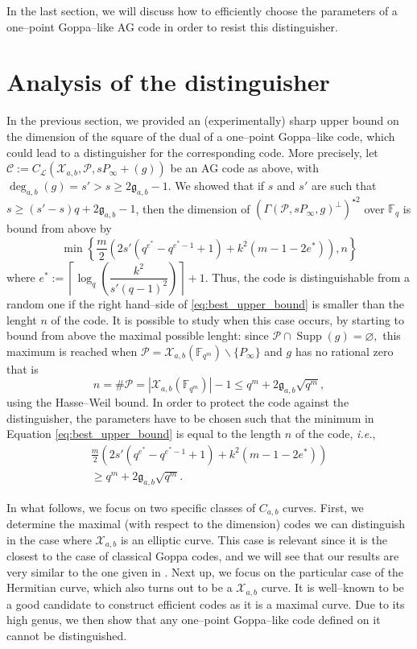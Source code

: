 \documentclass[lettersize,journal]{IEEEtran}
\theoremstyle{plain}
\theoremstyle{definition}
\theoremstyle{remark}
\newcommand{\calP}{\mathcal{P}}
\newcommand{\calL}{\mathcal{L}}
\newcommand{\calC}{\mathcal{C}}
\newcommand{\calX}{\mathcal{X}}
\newcommand{\fqm}{\mathbb{F}_{q^m}}
\newcommand{\fq}{\mathbb{F}_{q}}
\newcommand{\Supp}{\operatorname{Supp}}
\newcommand{\degab}[1]{\deg_{a,b}\left(#1\right)}
\begin{document}
	In the last section, we will discuss how to efficiently choose the parameters of a one--point Goppa--like AG code in order to resist this distinguisher.
	
	\section{Analysis of the distinguisher}\label{sec:analysis}
	
	In the previous section, we provided an (experimentally) sharp upper bound on the dimension of the square of the dual of a one--point Goppa--like code, which could lead to a distinguisher for the corresponding code. More precisely, let $\calC := C_\calL(\calX_{a,b},\calP,sP_\infty +(g))$ be an AG code as above, with $\degab{g} = s'>s\geq 2\mathfrak{g}_{a,b}-1$. We showed that if $s$ and $s'$ are such that $s \geq (s'-s)q+2\mathfrak{g}_{a,b}-1$, then the dimension of $(\Gamma(\calP,sP_\infty,g)^{\perp})^{\star 2}$ over $\fq$ is bound from above by
	\begin{equation} \label{eq:best_upper_bound}
		\min \left\{\frac{m}{2}\left(2s'(q^{e^*}-q^{e^*-1}+1)+k^2(m-1-2e^*)  \right),n\right\}
	\end{equation}
	where $e^* := \left\lceil \log_q\left(\dfrac{k^2}{s'(q-1)^2}\right)\right\rceil+1$. Thus, the code is distinguishable from a random one if the right hand--side of \eqref{eq:best_upper_bound} is smaller than the lenght $n$ of the code. It is possible to study when this case occurs, by starting to bound from above the maximal possible lenght: since $\calP \cap \Supp(g) = \varnothing,$ this maximum is reached when $\calP = \calX_{a,b}(\fqm) \backslash \{P_\infty\}$ and $g$ has no rational zero that is
	$$n = \# \calP = |\calX_{a,b}(\fqm)|-1 \leq q^m+2\mathfrak{g}_{a,b}\sqrt{q^m},$$
	using the Hasse--Weil bound. In order to protect the code against the distinguisher, the parameters have to be chosen such that the minimum in Equation \eqref{eq:best_upper_bound} is equal to the length $n$ of the code, \textit{i.e.}, 
	\begin{multline} \label{eq:cond_not_to_distinguish}
		\frac{m}{2}\left(2s'(q^{e^*}-q^{e^*-1}+1)+k^2(m-1-2e^*)  \right)\\
		\geq q^m+2\mathfrak{g}_{a,b}\sqrt{q^m}.
	\end{multline}
	
	In what follows, we focus on two specific classes of $C_{a,b}$ curves. First, we determine the maximal (with respect to the dimension) codes we can distinguish in the case where $\calX_{a,b}$ is an elliptic curve. This case is relevant since it is the closest to the case of classical Goppa codes, and we will see that our results are very similar to the one given in \cite{MT21}. Next up, we focus on the particular case of the Hermitian curve, which also turns out to be a $\calX_{a,b}$ curve. It is well--known to be a good candidate to construct efficient codes as it is a maximal curve. Due to its high genus, we then show that any one--point Goppa--like code defined on it cannot be distinguished.
	
\end{document}

